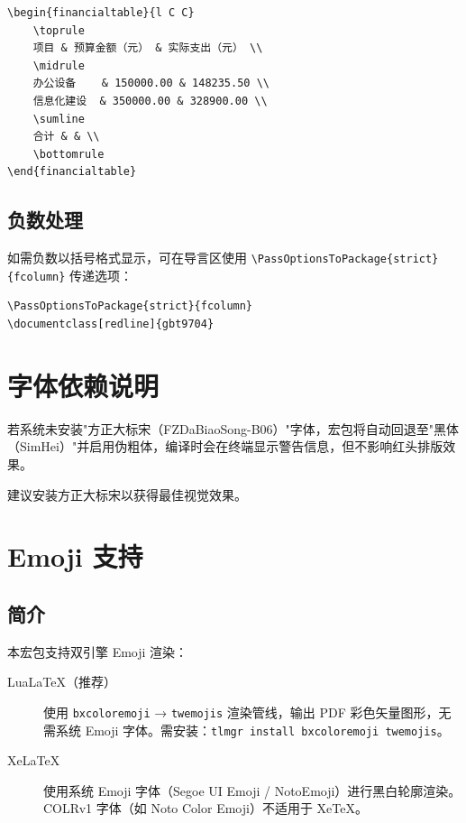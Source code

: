 \documentclass[redline, titleindent, zhlineskip]{gbt9704}
\begin{document}
\begin{verbatim}
\begin{financialtable}{l C C}
    \toprule
    项目 & 预算金额（元） & 实际支出（元） \\
    \midrule
    办公设备    & 150000.00 & 148235.50 \\
    信息化建设  & 350000.00 & 328900.00 \\
    \sumline
    合计 & & \\
    \bottomrule
\end{financialtable}
\end{verbatim}

\subsection{负数处理}
如需负数以括号格式显示，可在导言区使用 \verb|\PassOptionsToPackage{strict}{fcolumn}| 传递选项：

\begin{verbatim}
\PassOptionsToPackage{strict}{fcolumn}
\documentclass[redline]{gbt9704}
\end{verbatim}

\section{字体依赖说明}
若系统未安装"方正大标宋（FZDaBiaoSong-B06）"字体，宏包将自动回退至"黑体（SimHei）"并启用伪粗体，编译时会在终端显示警告信息，但不影响红头排版效果。

建议安装方正大标宋以获得最佳视觉效果。

\section{Emoji 支持}

\subsection{简介}
本宏包支持双引擎 Emoji 渲染：

\begin{description}
  \item[LuaLaTeX（推荐）] 使用 \texttt{bxcoloremoji} → \texttt{twemojis} 渲染管线，输出 PDF 彩色矢量图形，无需系统 Emoji 字体。需安装：\texttt{tlmgr install bxcoloremoji twemojis}。
  \item[XeLaTeX] 使用系统 Emoji 字体（Segoe UI Emoji / NotoEmoji）进行黑白轮廓渲染。COLRv1 字体（如 Noto Color Emoji）不适用于 XeTeX。
\end{description}
\end{document}
